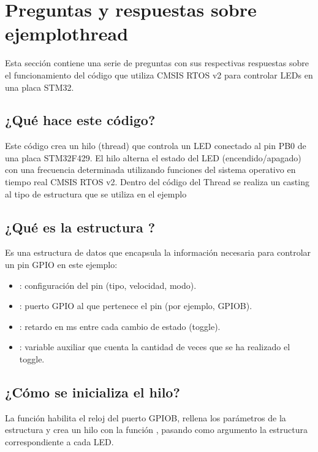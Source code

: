\documentclass[letterpaper,10pt,english]{sphinxmanual}
\begin{document}
\section{Preguntas y respuestas sobre ejemplothread}
\label{\detokenize{ejemplothread:preguntas-y-respuestas-sobre-ejemplothread}}
\sphinxAtStartPar
Esta sección contiene una serie de preguntas con sus respectivas respuestas sobre el funcionamiento del código que utiliza CMSIS RTOS v2 para controlar LEDs en una placa STM32.


\subsection{¿Qué hace este código?}
\label{\detokenize{ejemplothread:que-hace-este-codigo}}
\sphinxAtStartPar
Este código crea un hilo (thread) que controla un LED conectado al pin PB0 de una placa STM32F429. El hilo alterna el estado del LED (encendido/apagado) con una frecuencia determinada utilizando funciones del sistema operativo en tiempo real CMSIS RTOS v2.
Dentro del código del Thread se realiza un casting al tipo de estructura que se utiliza en el ejemplo


\subsection{¿Qué es la estructura ?}
\label{\detokenize{ejemplothread:que-es-la-estructura-mygpio-pin}}
\sphinxAtStartPar
Es una estructura de datos que encapsula la información necesaria para controlar un pin GPIO en este ejemplo:
\begin{itemize}
\item {} 
\sphinxAtStartPar
{}: configuración del pin (tipo, velocidad, modo).

\item {} 
\sphinxAtStartPar
{}: puerto GPIO al que pertenece el pin (por ejemplo, GPIOB).

\item {} 
\sphinxAtStartPar
{}: retardo en ms entre cada cambio de estado (toggle).

\item {} 
\sphinxAtStartPar
{}: variable auxiliar que cuenta la cantidad de veces que se ha realizado el toggle.

\end{itemize}


\subsection{¿Cómo se inicializa el hilo?}
\label{\detokenize{ejemplothread:como-se-inicializa-el-hilo}}
\sphinxAtStartPar
La función  habilita el reloj del puerto GPIOB, rellena los parámetros de la estructura y crea un hilo con la función , pasando como argumento la estructura  correspondiente a cada LED.
\end{document}
